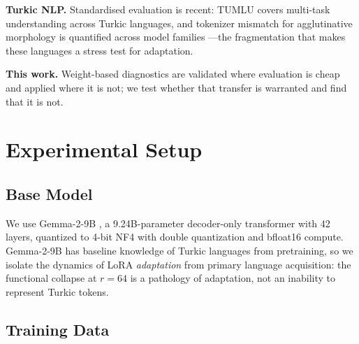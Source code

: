 \documentclass[11pt]{article}
\begin{document}
\textbf{Turkic NLP.} Standardised evaluation is recent: TUMLU \cite{isbarov2024tumlu} covers multi-task understanding across Turkic languages, and tokenizer mismatch for agglutinative morphology is quantified across model families \cite{rust2021good,ahia2023all}---the fragmentation that makes these languages a stress test for adaptation.

\textbf{This work.} Weight-based diagnostics are validated where evaluation is cheap and applied where it is not; we test whether that transfer is warranted and find that it is not.

\section{Experimental Setup}

\subsection{Base Model}

We use Gemma-2-9B \cite{team2024gemma}, a 9.24B-parameter decoder-only transformer with 42 layers, quantized to 4-bit NF4 with double quantization \cite{dettmers2023qlora} and bfloat16 compute. Gemma-2-9B has baseline knowledge of Turkic languages from pretraining, so we isolate the dynamics of LoRA \emph{adaptation} from primary language acquisition: the functional collapse at $r{=}64$ is a pathology of adaptation, not an inability to represent Turkic tokens.

\subsection{Training Data}
\label{sec:data}
\end{document}
